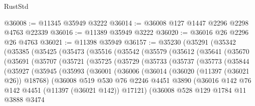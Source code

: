 \begin{lexlean}{RustStd}
\begin{coremodule}
@36008 := @11345 @35949 @3222
@36014 := @36008 @127 @1447 @2296 @2298 @4763 @22339
@36016 := @11389 @35949 @3222
@36020 := @36016 @26 @2296 @26 @4763
@36021 := @11398 @35949
@36157 := @35230
    (@35291
      (@35342
        (@35385
          (@35425
            (@35473
              (@35516
                (@35542
                  (@35579
                    (@35612
                      (@35641
                        (@35670
                          (@35691
                            (@35707
                              (@35721
                                (@35725
                                  (@35729
                                    (@35733
                                      (@35737
                                        (@35773
                                          (@35844
                                            (@35927
                                              (@35945
                                                (@35993
                                                  (@36001
                                                    (@36006
                                                      (@36014
                                                        (@36020 (@11397 (@36021 @26)) @18768)
                                                        (@36008
                                                          @519
                                                          @530
                                                          @76
                                                          @2246
                                                          @4451
                                                          @3890
                                                          (@36016
                                                            @142
                                                            @76
                                                            @142
                                                            @4451
                                                            (@11397 (@36021 @142))
                                                            @17121)
                                                          (@36008
                                                            @528
                                                            @129
                                                            @1784
                                                            @11
                                                            @3888
                                                            @3474

\end{coremodule}
\end{lexlean}
